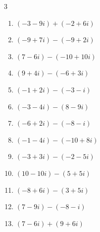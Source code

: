 \begin{multicols}{3}
\begin{enumerate}
  \item $\displaystyle (-3-9i) + (-2+6i)$

        \phantom{$\displaystyle =-5-3i$}

  \item $\displaystyle (-9+7i) - (-9+2i)$

        \phantom{$\displaystyle =5i$}

  \item $\displaystyle (7-6i) - (-10+10i)$

        \phantom{$\displaystyle =17-16i$}

  \item $\displaystyle (9+4i) - (-6+3i)$

        \phantom{$\displaystyle =15+i$}

  \item $\displaystyle (-1+2i) - (-3-i)$

        \phantom{$\displaystyle =2+3i$}

  \item $\displaystyle (-3-4i) - (8-9i)$

        \phantom{$\displaystyle =-11+5i$}

\columnbreak %

  \item $\displaystyle (-6+2i) - (-8-i)$

        \phantom{$\displaystyle =2+3i$}

  \item $\displaystyle (-1-4i) - (-10+8i)$

        \phantom{$\displaystyle =9-12i$}

  \item $\displaystyle (-3+3i) - (-2-5i)$

        \phantom{$\displaystyle =-1+8i$}

  \item $\displaystyle (10-10i) - (5+5i)$

        \phantom{$\displaystyle =5-15i$}

  \item $\displaystyle (-8+6i) - (3+5i)$

        \phantom{$\displaystyle =-11+i$}

  \item $\displaystyle (7-9i) - (-8-i)$

        \phantom{$\displaystyle =15-8i$}

  \item $\displaystyle (7-6i) + (9+6i)$


\end{enumerate}
\end{multicols}
